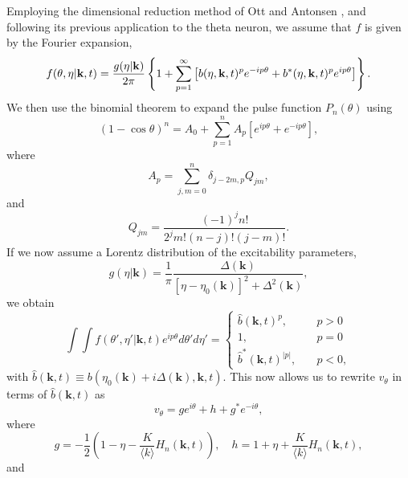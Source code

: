 \documentclass[%
 aip,
 sd,%
 amsmath,amssymb,
 reprint,%
]{revtex4-1}
\begin{document}
Employing the dimensional reduction method of Ott and Antonsen \cite{ott2008low, ott2009long, ott2011comment}, and following its previous application to the theta neuron\cite{luke2013complete}, we assume that $f$ is given by the Fourier expansion,
\begin{dmath} \label{eq:ansatz}
f(\theta, \eta | \mathbf{k}, t) = \frac{g(\eta | \mathbf{k})}{2 \pi} \left\{1\\ + \sum_{p = 1}^\infty \left[b(\eta, \mathbf{k}, t)^p e^{-i p \theta} +  b^*(\eta, \mathbf{k}, t)^p e^{i p \theta} \right] \right\}.
\end{dmath}
We then use the binomial theorem to expand the pulse function $P_n(\theta)$ using
\begin{equation} \label{eq:binomExp}
(1-\cos \theta)^n = A_0 + \sum_{p = 1}^n A_p [e^{i p \theta} + e^{-i p \theta}],
\end{equation}
where
\begin{equation} \label{eq:Acoeff}
A_p = \sum_{j,m=0}^n \delta_{j-2m, p} Q_{jm},
\end{equation}
and
\begin{equation} \label{eq:Qcoeff}
Q_{jm} = \frac{(-1)^j n!}{2^j m! (n-j)! (j-m)!}.
\end{equation}
If we now assume a Lorentz distribution of the excitability parameters, 
\begin{equation} \label{eq:Lorentzian}
g(\eta | \mathbf{k}) = \frac{1}{\pi} \frac{\Delta(\mathbf{k})}{[\eta - \eta_0(\mathbf{k})]^2 + \Delta^2(\mathbf{k})},
\end{equation}
we obtain
\begin{equation} \label{eq:expIntegral}
\int \int f(\theta', \eta' | \mathbf{k}, t) e^{i p \theta} d\theta' d\eta' = \left\{
        \begin{array}{ll}
            \hat b(\mathbf{k}, t)^p, & \quad p > 0 \\
            1, & \quad p = 0 \\
            \hat b^*(\mathbf{k},t)^{|p|}, & \quad p < 0,
        \end{array}
    \right.
\end{equation}
with $\hat b(\mathbf{k}, t) \equiv b(\eta_0(\mathbf{k}) + i \Delta(\mathbf{k}), \mathbf{k}, t)$.
This now allows us to rewrite $v_{\theta}$ in terms of $\hat b(\mathbf{k},t)$ as
\begin{equation} \label{eq:vEq}
v_\theta = g e^{i \theta} + h + g^* e^{-i \theta},
\end{equation}
where
\begin{equation} \label{eq:g&h}
g = -\frac{1}{2} (1 - \eta - \frac{K}{\langle k \rangle} H_n( \mathbf{k}, t)), \quad h = 1 + \eta + \frac{K}{\langle k \rangle} H_n( \mathbf{k}, t),
\end{equation}
and 
\end{document}
